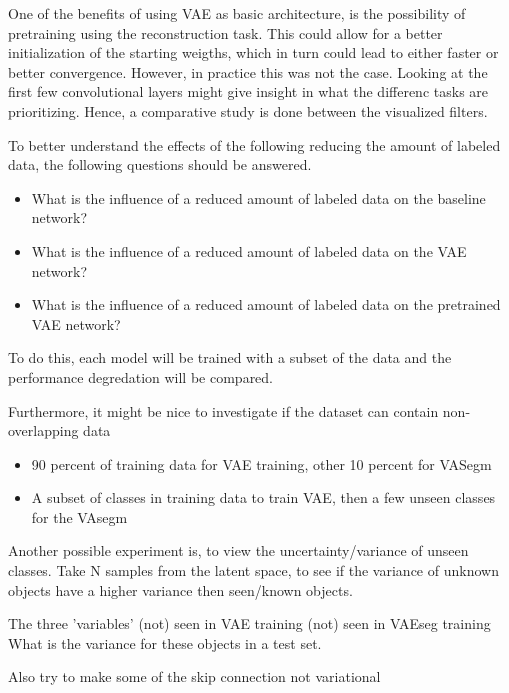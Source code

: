 One of the benefits of using VAE as basic architecture, is the possibility of pretraining using the reconstruction task. This could allow for a better initialization of the starting weigths, which in turn could lead to either faster or better convergence. However, in practice this was not the case. Looking at the first few convolutional layers might give insight in what the differenc tasks are prioritizing. Hence, a comparative study is done between the visualized filters.

To better understand the effects of the following reducing the amount of labeled data, the following questions should be answered.
\begin{itemize}
    \item What is the influence of a reduced amount of labeled data on the baseline network?
    \item What is the influence of a reduced amount of labeled data on the VAE network?
    \item What is the influence of a reduced amount of labeled data on the pretrained VAE network?
\end{itemize}
To do this, each model will be trained with a subset of the data and the performance degredation will be compared.


Furthermore, it might be nice to investigate if the dataset can contain non-overlapping data
\begin{itemize}
    \item 90 percent of training data for VAE training, other 10 percent for VASegm
    \item A subset of classes in training data to train VAE, then a few unseen classes for the VAsegm
\end{itemize}

Another possible experiment is, to view the uncertainty/variance of unseen classes. Take N samples from the latent space, to see if the variance of unknown objects have a higher variance then seen/known objects.

The three 'variables'
(not) seen in VAE training
(not) seen in VAEseg training
What is the variance for these objects in a test set.


Also try to make some of the skip connection not variational







